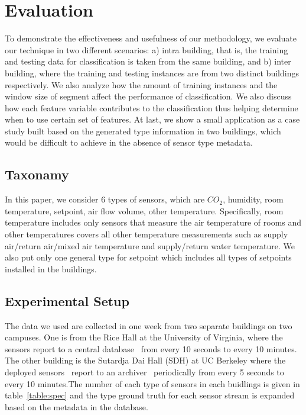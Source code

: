 \section{Evaluation}
To demonstrate the effectiveness and usefulness of our methodology, we evaluate our technique in two different scenarios: a) intra building, that is, the 
training and testing data for classification is taken from the same building, and b) inter building, where the training and testing instances are from two 
distinct buildings respectively. We also analyze how the amount of training instances and the window size of segment affect the performance of classification. We also discuss how each feature variable contributes to the classification thus helping determine when to use certain set of features. At last, we show a small application as a case study built based on the generated type information in two buildings, which would be difficult to achieve in the absence of sensor type metadata.

\subsection{Taxonamy}
In this paper, we consider 6 types of sensors, which are $CO_{2}$, humidity, room temperature, setpoint, air flow volume, other temperature. Specifically, room 
temperature includes only sensors that measure the air temperature of rooms and other temperatures covers all other temperature measurements such as supply 
air/return air/mixed air temperature and supply/return water temperature. We also put only one general type for setpoint which includes all types of setpoints 
installed in the buildings.

\subsection{Experimental Setup}
The data we used are collected in one week from two separate buildings on two campuses. One is from the Rice Hall at 
the University of Virginia, where the sensors report to a central database~\cite{trane} from every 10 seconds to every 10 minutes. The other building is the Sutardja Dai Hall (SDH) at UC Berkeley where the deployed 
sensors~\cite{keti, bacnet} report to an archiver~\cite{smap} periodically from every 5 seconds to every 10 minutes.The number of each type of sensors in 
each buidlings is given in table~\ref{table:spec} and the type ground truth for each sensor stream is expanded based on the metadata in the database.


